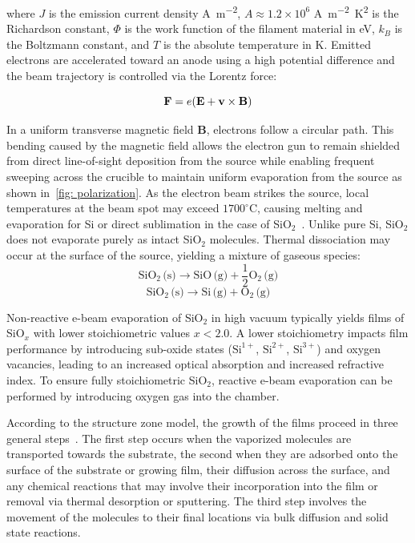 where $J$ is the emission current density \unit{\ampere\per\square\meter}, $A \approx 1.2 \times 10^6$ \unit{\ampere\per\square\meter\square\kelvin} is the Richardson constant, $\Phi$ is the work function of the filament material in \unit{\electronvolt}, $k_B$ is the Boltzmann constant, and $T$ is the absolute temperature in \unit{\kelvin}. Emitted electrons are accelerated toward an anode using a high potential difference and the beam trajectory is controlled via the Lorentz force:

\begin{equation} \label{eqn: Lorentz}
		\textbf F=e(\textbf E+\textbf v \times\textbf B)
\end{equation}

In a uniform transverse magnetic field $\mathbf{B}$, electrons follow a circular path. This bending caused by the magnetic field allows the electron gun to remain shielded from direct line-of-sight deposition from the source while enabling frequent sweeping across the crucible to maintain uniform evaporation from the source as shown in~\ref{fig: polarization}. As the electron beam strikes the source, local temperatures at the beam spot may exceed $1700^\circ\text{C}$, causing melting and evaporation for Si or direct sublimation in the case of SiO$_2$~\cite{xueElectronBeamEvaporated2025}. Unlike pure Si, SiO$_2$ does not evaporate purely as intact SiO$_2$ molecules. Thermal dissociation may occur at the surface of the source, yielding a mixture of gaseous species:
\begin{equation} \label{eqn: sio_evap}
	\text{SiO}_2\,\text{(s)} \longrightarrow \text{SiO}\,\text{(g)} + \frac{1}{2}\text{O}_2\,\text{(g)}
\end{equation}
\begin{equation} \label{eqn: si_evap}
	\text{SiO}_2\,\text{(s)} \longrightarrow \text{Si}\,\text{(g)} + \text{O}_2\,\text{(g)}
\end{equation}

Non-reactive e-beam evaporation of SiO$_2$ in high vacuum typically yields films of SiO$_x$ with lower stoichiometric values $x < 2.0$. A lower stoichiometry impacts film performance by introducing sub-oxide states ($\text{Si}^{1+}$, $\text{Si}^{2+}$, $\text{Si}^{3+}$) and oxygen vacancies, leading to an increased optical absorption and increased refractive index. To ensure fully stoichiometric SiO$_2$, reactive e-beam evaporation can be performed by introducing oxygen gas into the chamber.

According to the structure zone model, the growth of the films proceed in three general steps~\cite{thorntonStructureZoneModelsThin1988}. The first step occurs when the vaporized molecules are transported towards the substrate, the second when they are adsorbed onto the surface of the substrate or growing film, their diffusion across the surface, and any chemical reactions that may involve their incorporation into the film or removal via thermal desorption or sputtering. The third step involves the movement of the molecules to their final locations via bulk diffusion and solid state reactions. 


